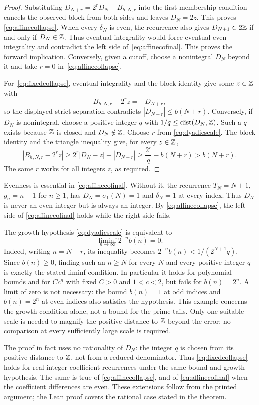 \documentclass[11pt]{article}
\begin{document}
\begin{proof}
Substituting $D_{N+r}=2^rD_N-B_{h,N,r}$ into the first membership condition cancels the
observed block from both sides and leaves $D_N=2z$.  This proves
\eqref{eq:affinecollapse}.  When every $\delta_N$ is even, the recurrence
also gives $D_{N+1}\in2\mathbb{Z}$ if and only if $D_N\in\mathbb{Z}$.
Thus eventual integrality would force eventual even integrality and
contradict the left side of~\eqref{eq:affinecofinal}.  This proves the
forward implication.  Conversely, given a cutoff, choose a nonintegral
$D_N$ beyond it and take $r=0$ in~\eqref{eq:affinecollapse}.

For~\eqref{eq:fixedcollapse}, eventual integrality and the block identity give
some $z\in\mathbb{Z}$ with
\[
 B_{h,N,r}-2^rz=-D_{N+r},
\]
so the displayed strict separation contradicts $|D_{N+r}|\le b(N+r)$.
Conversely, if $D_N$ is nonintegral, choose a positive integer $q$ with
$1/q\le\operatorname{dist}(D_N,\mathbb{Z})$.  Such a $q$ exists because $\mathbb{Z}$ is
closed and $D_N\notin\mathbb{Z}$.  Choose $r$ from \eqref{eq:dyadicscale}.  The block identity and the triangle inequality
give, for every $z\in\mathbb{Z}$,
\[
 |B_{h,N,r}-2^rz|
 \ge 2^r|D_N-z|-|D_{N+r}|
 \ge \frac{2^r}{q}-b(N+r)>b(N+r).
\]
The same $r$ works for all integers $z$, as required.
\end{proof}

Evenness is essential in \eqref{eq:affinecofinal}.  Without it, the
recurrence $T_N=N+1$, $g_n=n-1$ for $n\ge1$, has
$D_N=\sigma_1(N)=1$ and $\delta_N=1$ at every index.  Thus $D_N$ is never
an even integer but is always an integer.  By
\eqref{eq:affinecollapse}, the left side of
\eqref{eq:affinecofinal} holds while the right side fails.

The growth hypothesis \eqref{eq:dyadicscale} is equivalent to
\[
 \liminf_{n\to\infty}2^{-n}b(n)=0.
\]
Indeed, writing $n=N+r$, its inequality becomes
$2^{-n}b(n)<1/(2^{N+1}q)$.  Since $b(n)\ge0$, finding such an $n\ge N$
for every $N$ and every positive integer $q$ is exactly the stated
liminf condition.  In particular it holds for polynomial bounds and for
$Cc^n$ with fixed $C>0$ and $1<c<2$, but fails for $b(n)=2^n$.
A limit of zero is not necessary: the bound $b(n)=1$ at odd indices and
$b(n)=2^n$ at even indices also satisfies the hypothesis.  This example
concerns the growth condition alone, not a bound for the prime tails.
Only one suitable scale is needed to magnify the positive distance to
$\mathbb{Z}$ beyond the error; no comparison at every sufficiently large scale
is required.

The proof in fact uses no rationality of $D_N$: the integer $q$ is chosen
from its positive distance to $\mathbb{Z}$, not from a reduced denominator.
Thus \eqref{eq:fixedcollapse} holds for real integer-coefficient
recurrences under the same bound and growth hypothesis.  The same is
true of \eqref{eq:affinecollapse}, and of \eqref{eq:affinecofinal} when the
coefficient differences are even.  These extensions follow from the
printed argument; the Lean proof covers the rational case stated in the
theorem.
\end{document}
